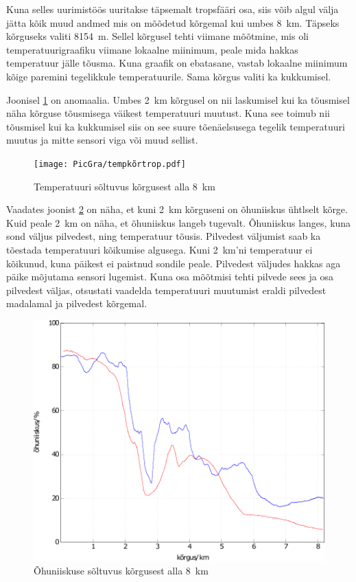 \documentclass{trkut}%
\begin{document}
Kuna selles uurimistöös uuritakse täpsemalt tropsfääri osa, siis võib algul välja jätta kõik muud andmed mis on mõõdetud kõrgemal kui umbes \SI{8}{km}. Täpseks kõrguseks valiti \SI{8154}{m}. Sellel kõrgusel tehti viimane mõõtmine, mis oli temperatuurigraafiku viimane lokaalne miinimum, peale mida hakkas temperatuur jälle tõusma. Kuna graafik on ebatasane, vastab lokaalne miinimum kõige paremini tegelikkule temperatuurile. Sama kõrgus valiti ka kukkumisel.

Joonisel \ref{tempkõrtrop} on anomaalia. Umbes \SI{2}{km} kõrgusel on nii laskumisel kui ka tõusmisel näha kõrguse tõusmisega väikest temperatuuri muutust. Kuna see toimub nii tõusmisel kui ka kukkumisel siis on see suure tõenäelsusega tegelik temperatuuri muutus ja mitte sensori viga või muud sellist.
\begin{figure}[h]
	\texttt{[image: PicGra/tempkõrtrop.pdf]}
	\caption{Temperatuuri sõltuvus kõrgusest alla \SI{8}{km}}
	\label{tempkõrtrop}%
\end{figure}

Vaadates joonist \ref{humkõrtrop} on näha, et kuni \SI{2}{km} kõrguseni on õhuniiskus ühtlselt kõrge. Kuid peale \SI{2}{km} on näha, et õhuniiskus langeb tugevalt. Õhuniiskus langes, kuna sond väljus pilvedest, ning temperatuur tõusis. Pilvedest väljumist saab ka tõestada temperatuuri kõikumise algusega. Kuni \SI{2}{km}'ni temperatuur ei kõikunud, kuna päikest ei paistnud sondile peale. Pilvedest väljudes hakkas aga päike mõjutama sensori lugemist. Kuna osa mõõtmisi tehti pilvede sees ja osa pilvedest väljas, otsustati vaadelda temperatuuri muutumist eraldi pilvedest madalamal ja pilvedest kõrgemal.
\begin{figure}[h]
	\includegraphics[width=1\textwidth]{PicGra/humkõrtrop.pdf}
	\caption{Õhuniiskuse sõltuvus kõrgusest alla \SI{8}{km}}
	\label{humkõrtrop}%
\end{figure}
\end{document}
